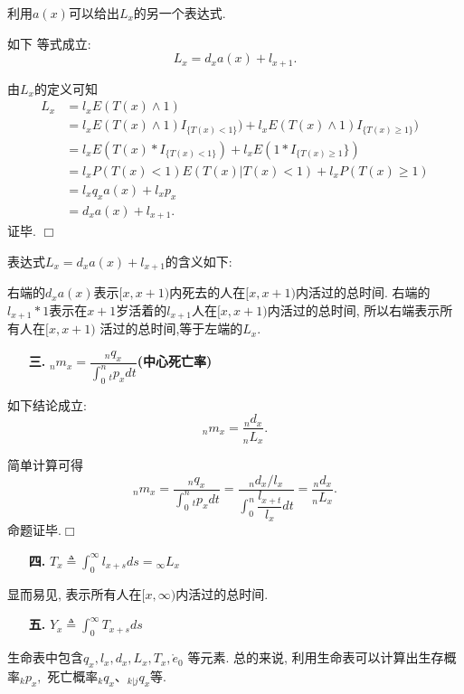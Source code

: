 \documentclass[a4paper,10pt]{ctexbook}
\newcommand{\hei}{\CJKfamily{hei}}      %
\def\qed{\hfill$\Box$\medskip}
\begin{document}
利用$a(x)$可以给出$L_x$的另一个表达式.
\begin{proposition}如下
    等式成立: $$L_x=d_xa(x)+l_{x+1}.$$
\end{proposition}
\proof 由$L_x$的定义可知
\begin{align*}
    L_x & =l_xE(T(x)\wedge1)                                                     \\
        & =l_xE(T(x)\wedge1)I_{\{T(x)<1\}})+l_xE(T(x)\wedge 1)I_{\{T(x)\ge 1\}}) \\
        & =l_xE(T(x)*I_{\{T(x)<1\}})+l_xE(1*I_{\{T(x)\ge 1}\})                   \\
        & =l_xP(T(x)<1)E(T(x)|T(x)<1)+l_xP(T(x)\ge 1)                            \\
        & =l_xq_xa(x)+l_xp_x                                                     \\
        & =d_xa(x)+l_{x+1}.
\end{align*}
证毕. \qed

表达式$L_x=d_xa(x)+l_{x+1}$的含义如下:

\noindent 右端的$d_xa(x)$表示$[x,x+1)$内死去的人在$[x,x+1)$内活过的总时间. 右端的$l_{x+1}*1$表示在$x+1$岁活着的$l_{x+1}$人在$[x,x+1)$内活过的总时间, 所以右端表示所有人在$[x,x+1)$ 活过的总时间,等于左端的$L_x.$
\begin{itemize}
    \item[{\bf\hei 三.}]{\bf\hei ${}_nm_x=\dfrac {{}_nq_x}{\int_0^n{}_tp_xdt}$(中心死亡率)}
\end{itemize}


\begin{proposition}如下结论成立:
    $${}_nm_x=\dfrac{{}_nd_x}{{}_nL_x}.$$
\end{proposition}
\proof 简单计算可得
$${}_nm_x=\dfrac{{}_nq_x}{\int_0^n{}_tp_xdt}=\dfrac{{}_nd_x/l_x}{\int_0^n\dfrac{l_{x+t}}{l_x}dt}=
    \dfrac{{}_nd_x}{{}_nL_x}.$$命题证毕.\qed

\begin{itemize}
    \item[{\bf\hei 四.}]{\bf\hei $T_x\triangleq\int_0^{\infty}l_{x+s}ds={}_{\infty}L_x$}
\end{itemize}
显而易见, 表示所有人在$[x,\infty)$内活过的总时间.

\begin{itemize}
    \item[{\bf\hei 五.}]{\bf\hei $Y_x\triangleq\int_0^{\infty}T_{x+s}ds$}
\end{itemize}

生命表中包含$q_x,l_x,d_x,L_x,T_x,\mathring{e}_0$ 等元素. 总的来说, 利用生命表可以计算出生存概率${}_kp_x,$ 死亡概率${}_kq_x$、${}_{k|j}q_x$等.
\newpage
\end{document}
